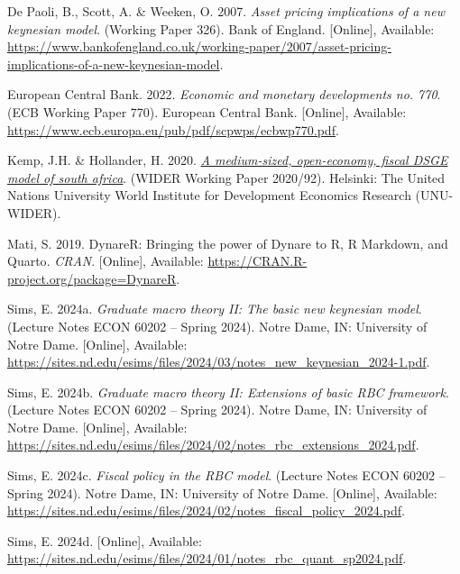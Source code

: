 \documentclass[11pt,preprint]{elsarticle}
\numberwithin{equation}{section}
\numberwithin{figure}{section}
\numberwithin{table}{section}
\newlength{\cslhangindent}
\newenvironment{CSLReferences}[2] %
{\begin{list}{}{%
	\setlength{\itemindent}{0pt}
	\setlength{\leftmargin}{0pt}
	\setlength{\parsep}{0pt}
	\ifodd #1
	\setlength{\leftmargin}{\cslhangindent}
	\setlength{\itemindent}{-1\cslhangindent}
	\fi
	\setlength{\itemsep}{#2\baselineskip}}}
{\end{list}}
\begin{document}
\label{refs}
\begin{CSLReferences}{1}{1}
De Paoli, B., Scott, A. \& Weeken, O. 2007. \emph{Asset pricing
implications of a new keynesian model}. (Working Paper 326). Bank of
England. {[}Online{]}, Available:
\url{https://www.bankofengland.co.uk/working-paper/2007/asset-pricing-implications-of-a-new-keynesian-model}.

European Central Bank. 2022. \emph{Economic and monetary developments
no. 770}. (ECB Working Paper 770). European Central Bank. {[}Online{]},
Available: \url{https://www.ecb.europa.eu/pub/pdf/scpwps/ecbwp770.pdf}.

Kemp, J.H. \& Hollander, H. 2020.
\emph{\href{https://doi.org/10.35188/UNU-WIDER/2020/849-8}{A
medium-sized, open-economy, fiscal DSGE model of south africa}}. (WIDER
Working Paper 2020/92). Helsinki: The United Nations University World
Institute for Development Economics Research (UNU-WIDER).

Mati, S. 2019. DynareR: Bringing the power of {Dynare} to {R}, {R
Markdown}, and {Quarto}. \emph{CRAN}. {[}Online{]}, Available:
\url{https://CRAN.R-project.org/package=DynareR}.

Sims, E. 2024a. \emph{Graduate macro theory II: The basic new keynesian
model}. (Lecture Notes ECON 60202 -- Spring 2024). Notre Dame, IN:
University of Notre Dame. {[}Online{]}, Available:
\url{https://sites.nd.edu/esims/files/2024/03/notes_new_keynesian_2024-1.pdf}.

Sims, E. 2024b. \emph{Graduate macro theory II: Extensions of basic RBC
framework}. (Lecture Notes ECON 60202 -- Spring 2024). Notre Dame, IN:
University of Notre Dame. {[}Online{]}, Available:
\url{https://sites.nd.edu/esims/files/2024/02/notes_rbc_extensions_2024.pdf}.

Sims, E. 2024c. \emph{Fiscal policy in the RBC model}. (Lecture Notes
ECON 60202 -- Spring 2024). Notre Dame, IN: University of Notre Dame.
{[}Online{]}, Available:
\url{https://sites.nd.edu/esims/files/2024/02/notes_fiscal_policy_2024.pdf}.

Sims, E. 2024d. {[}Online{]}, Available:
\url{https://sites.nd.edu/esims/files/2024/01/notes_rbc_quant_sp2024.pdf}.

\end{CSLReferences}


\end{document}
